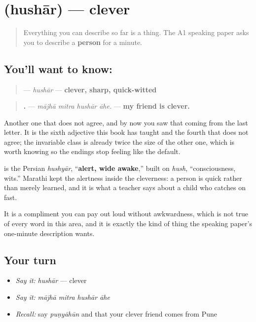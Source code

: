 \section[\texorpdfstring{\mr{हुशार} (hushār)}{हुशार (hushār)}]{ (hushār) — clever}

\label{lesson:MR-C51-hushaar}



\begin{quote}
Everything you can describe so far is a thing. The A1 speaking paper asks you to describe a \textbf{person} for a minute.
\end{quote}

\subsection*{You'll want to know: }
\begin{quote}
\textbf{} — \emph{hushār} — \textbf{clever, sharp, quick-witted}
\end{quote}

\begin{quote}
\textbf{   .} — \emph{mājhā mitra hushār āhe.} — \textbf{my friend is clever.}
\end{quote}

Another one that does not agree, and by now you saw that coming from the last letter. It is the sixth adjective this book has taught and the fourth that does not agree; the invariable class is already twice the size of the other one, which is worth knowing so the endings stop feeling like the default.

\textbf{} is the Persian \emph{hushyār}, \textquotedblleft{}\textbf{alert, wide awake},\textquotedblright{} built on \emph{hush}, \textquotedblleft{}consciousness, wits.\textquotedblright{} Marathi kept the alertness inside the cleverness: a \textbf{} person is quick rather than merely learned, and it is what a teacher says about a child who catches on fast.

It is a compliment you can pay out loud without awkwardness, which is not true of every word in this area, and it is exactly the kind of thing the speaking paper's one-minute description wants.

\subsection*{Your turn}
\begin{itemize}
\raggedright
  \item \emph{Say it:} \emph{hushār} — clever
  \item \emph{Say it:} \emph{mājhā mitra hushār āhe}
  \item \emph{Recall:} say \emph{puṇyāhūn} and that your clever friend comes from Pune
\end{itemize}

